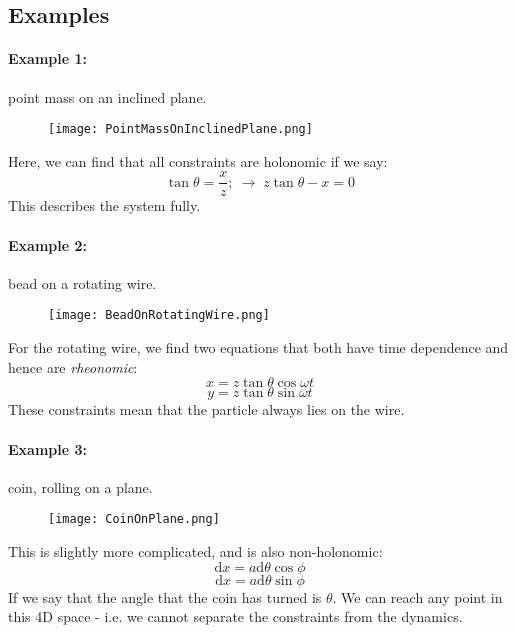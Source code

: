\subsection{Examples}
\paragraph{Example 1:} point mass on an inclined plane.
\begin{figure}[h!]
	\centering
	\texttt{[image: PointMassOnInclinedPlane.png]}
\end{figure}
Here, we can find that all constraints are holonomic if we say:
$$
	\tan\theta = \frac{x}{z} ;\ \rightarrow \;
	z\tan\theta - x = 0
$$
This describes the system fully.

\paragraph{Example 2:} bead on a rotating wire.
\begin{figure}[h!]
    \centering
	\texttt{[image: BeadOnRotatingWire.png]}
\end{figure}
For the rotating wire, we find two equations that both have time dependence and
hence are \emph{rheonomic}:
$$
	x = z\tan\theta\cos\omega t
$$
$$
	y = z\tan\theta\sin\omega t
$$
These constraints mean that the particle always lies on the wire.

\paragraph{Example 3:} coin, rolling on a plane.
\begin{figure}[h!]
	\centering
	\texttt{[image: CoinOnPlane.png]}
\end{figure}
This is slightly more complicated, and is also non-holonomic:
$$
	\mathrm{d}x = a\mathrm{d}\theta \cos \phi
$$
$$
	\mathrm{d}x = a\mathrm{d}\theta \sin \phi
$$
If we say that the angle that the coin has turned is $\theta$. We can reach any
point in this 4D space - i.e. we cannot separate the constraints from the
dynamics.

